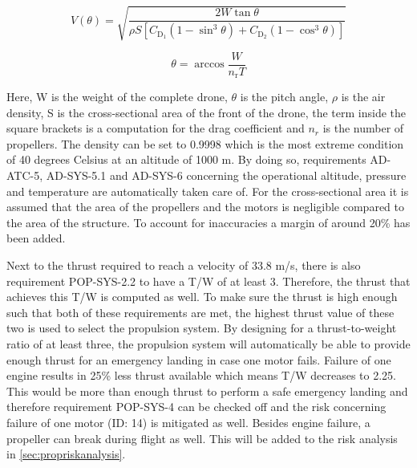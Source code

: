 \begin{equation}
\label{eq:forwardvelocity}
V(\theta) = \sqrt{\frac{2 W \tan \theta}{\rho S\left[C_{\mathrm{D}_{1}}\left(1-\sin ^{3} \theta\right)+C_{\mathrm{D}_{2}}\left(1-\cos ^{3} \theta\right)\right]}}
\end{equation}

\begin{equation}
\label{eq:thetathrust}
\theta =\arccos \frac{W}{n_{\mathrm{r}} T}
\end{equation}

Here, W is the weight of the complete drone, $\theta$ is the pitch angle, $\rho$ is the air density, S is the cross-sectional area of the front of the drone, the term inside the square brackets is a computation for the drag coefficient and $n_r$ is the number of propellers. The density can be set to 0.9998 which is the most extreme condition of 40 degrees Celsius at an altitude of 1000 m. By doing so, requirements AD-ATC-5, AD-SYS-5.1 and AD-SYS-6 concerning the operational altitude, pressure and temperature are automatically taken care of. For the cross-sectional area it is assumed that the area of the propellers and the motors is negligible compared to the area of the structure. To account for inaccuracies a margin of around 20\% has been added.

Next to the thrust required to reach a velocity of 33.8 m/s, there is also requirement POP-SYS-2.2 to have a T/W of at least 3. Therefore, the thrust that achieves this T/W is computed as well. To make sure the thrust is high enough such that both of these requirements are met, the highest thrust value of these two is used to select the propulsion system. By designing for a thrust-to-weight ratio of at least three, the propulsion system will automatically be able to provide enough thrust for an emergency landing in case one motor fails. Failure of one engine results in 25\% less thrust available which means T/W decreases to 2.25. This would be more than enough thrust to perform a safe emergency landing and therefore requirement POP-SYS-4 can be checked off and the risk concerning failure of one motor (ID: 14) is mitigated as well. Besides engine failure, a propeller can break during flight as well. This will be added to the risk analysis in \autoref{sec:propriskanalysis}.

